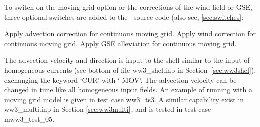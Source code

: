 To switch on the moving grid option or the corrections of the wind field or GSE, three
optional switches are added to the \ws\ source code (also see, \para\ref{sec:switches}:

\begin{slist}
 {Apply advection correction for continuous moving grid.}
 {Apply wind correction for continuous moving grid.}
 {Apply GSE alleviation for
           continuous moving grid.}
\end{slist}

\noindent
The advection velocity and direction is input to the shell similar to the
input of homogeneous currents (see bottom of file {\file ww3\_shel.inp} in
Section~\ref{sec:ww3shel}), exchanging the keyword `{\code CUR}' with `{\code
  MOV}'. The advection velocity can be changed in time like all homogeneous
input fields. An example of running with a moving grid model is given in test
case {\file ww3\_ts3}. A similar capability exist in {\file ww3\_multi.inp} in
Section \ref{sec:ww3multi}, and is tested in test case {\file mww3\_test\_05}.
